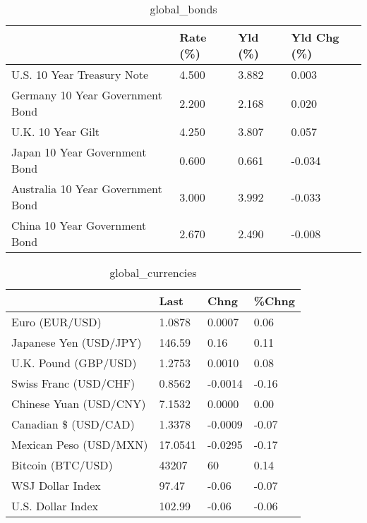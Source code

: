 \documentclass{article}%
\begin{document}
%


\begin{table}[htbp]%
\caption{global\_bonds}%
\centering%
\begin{adjustbox}{width=1\textwidth}%
\begin{tabular}{llll}
\toprule
                                  & Rate (\%) & Yld (\%) & Yld Chg (\%) \\
\midrule
       U.S. 10 Year Treasury Note &    4.500 &   3.882 &       0.003 \\
  Germany 10 Year Government Bond &    2.200 &   2.168 &       0.020 \\
                U.K. 10 Year Gilt &    4.250 &   3.807 &       0.057 \\
    Japan 10 Year Government Bond &    0.600 &   0.661 &      -0.034 \\
Australia 10 Year Government Bond &    3.000 &   3.992 &      -0.033 \\
    China 10 Year Government Bond &    2.670 &   2.490 &      -0.008 \\
\bottomrule
\end{tabular}
%
\end{adjustbox}%
\end{table}

%


\begin{table}[htbp]%
\caption{global\_currencies}%
\centering%
\begin{adjustbox}{width=1\textwidth}%
\begin{tabular}{llll}
\toprule
                       &    Last &    Chng & \%Chng \\
\midrule
        Euro (EUR/USD) &  1.0878 &  0.0007 &  0.06 \\
Japanese Yen (USD/JPY) &  146.59 &    0.16 &  0.11 \\
  U.K. Pound (GBP/USD) &  1.2753 &  0.0010 &  0.08 \\
 Swiss Franc (USD/CHF) &  0.8562 & -0.0014 & -0.16 \\
Chinese Yuan (USD/CNY) &  7.1532 &  0.0000 &  0.00 \\
  Canadian \$ (USD/CAD) &  1.3378 & -0.0009 & -0.07 \\
Mexican Peso (USD/MXN) & 17.0541 & -0.0295 & -0.17 \\
     Bitcoin (BTC/USD) &   43207 &      60 &  0.14 \\
      WSJ Dollar Index &   97.47 &   -0.06 & -0.07 \\
     U.S. Dollar Index &  102.99 &   -0.06 & -0.06 \\
\bottomrule
\end{tabular}
%
\end{adjustbox}%
\end{table}
\end{document}
